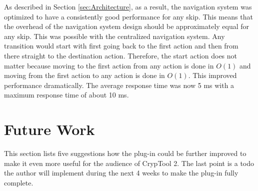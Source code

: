 \begin{enumerate}[label=(\labelenum{S}{{\arabic*}}), wide, labelwidth=!, labelindent=0pt]
As described in Section \ref{sec:Architecture}, as a result, the navigation system was optimized to have a consistently good performance for any skip. This means that the overhead of the navigation system design should be approximately equal for any skip. This was possible with the centralized navigation system. Any transition would start with first going back to the first action and then from there straight to the destination action. Therefore, the start action does not matter because moving to the first action from any action is done in $O(1)$ and moving from the first action to any action is done in $O(1)$. This improved performance dramatically. The average response time was now 5 ms with a maximum response time of about 10 ms.


\end{enumerate}

\section{Future Work}
\label{sec:futureWork}

This section lists five suggestions how the plug-in could be further improved to make it even more useful for the audience of CrypTool 2. The last point is a todo the author will implement during the next 4 weeks to make the plug-in fully complete.

